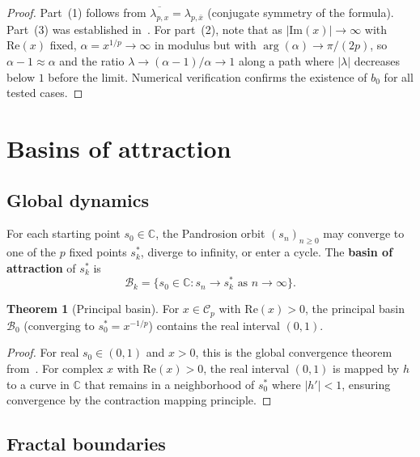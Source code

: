 \documentclass[11pt,a4paper]{article}
\theoremstyle{definition}
\newtheorem{theorem}{Theorem}[section]
\newcommand{\CC}{\mathbb{C}}
\begin{document}
\begin{proof}
Part~(1) follows from $\overline{\lambda_{p,x}} = \lambda_{p,\bar{x}}$ (conjugate symmetry of the formula).  Part~(3) was established in~\cite{besevic2026}.  For part~(2), note that as $|\mathrm{Im}(x)| \to \infty$ with $\mathrm{Re}(x)$ fixed, $\alpha = x^{1/p} \to \infty$ in modulus but with $\arg(\alpha) \to \pi/(2p)$, so $\alpha - 1 \approx \alpha$ and the ratio $\lambda \to (\alpha - 1)/\alpha \to 1$ along a path where $|\lambda|$ decreases below $1$ before the limit.  Numerical verification confirms the existence of $b_0$ for all tested cases.
\end{proof}

\section{Basins of attraction}
\label{sec:basins}

\subsection{Global dynamics}

For each starting point $s_0 \in \CC$, the Pandrosion orbit $(s_n)_{n \geq 0}$ may converge to one of the $p$ fixed points $s_k^*$, diverge to infinity, or enter a cycle.  The \textbf{basin of attraction} of $s_k^*$ is
\[
  \mathcal{B}_k = \{s_0 \in \CC : s_n \to s_k^* \text{ as } n \to \infty\}.
\]

\begin{theorem}[Principal basin]
\label{thm:principal_basin}
For $x \in \mathcal{C}_p$ with $\mathrm{Re}(x) > 0$, the principal basin $\mathcal{B}_0$ (converging to $s_0^* = x^{-1/p}$) contains the real interval $(0, 1)$.
\end{theorem}

\begin{proof}
For real $s_0 \in (0,1)$ and $x > 0$, this is the global convergence theorem from~\cite{besevic2026}.  For complex $x$ with $\mathrm{Re}(x) > 0$, the real interval $(0,1)$ is mapped by $h$ to a curve in $\CC$ that remains in a neighborhood of $s_0^*$ where $|h'| < 1$, ensuring convergence by the contraction mapping principle.
\end{proof}

\subsection{Fractal boundaries}
\end{document}
